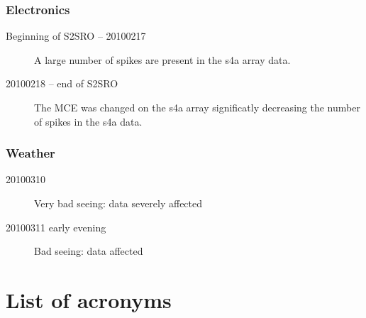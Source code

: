 \documentclass[twoside,11pt]{article}
\newcommand{\xlabel}[1]{}
\renewcommand{\_}{\texttt{\symbol{95}}}
\begin{document}
\subsubsection{Electronics}

\begin{description}

\item[Beginning of S2SRO -- 20100217] \mbox{}

  A large number of spikes are present in the s4a array data.

\item[20100218 -- end of S2SRO] \mbox{}

  The MCE was changed on the s4a array significatly decreasing the
  number of spikes in the s4a data.

\end{description}

\subsubsection{Weather}

\begin{description}

\item[20100310] \mbox{}

  Very bad seeing: data severely affected

\item[20100311 early evening] \mbox{}
  Bad seeing: data affected

\end{description}


\section{\xlabel{acronyms}List of acronyms}
\end{document}
